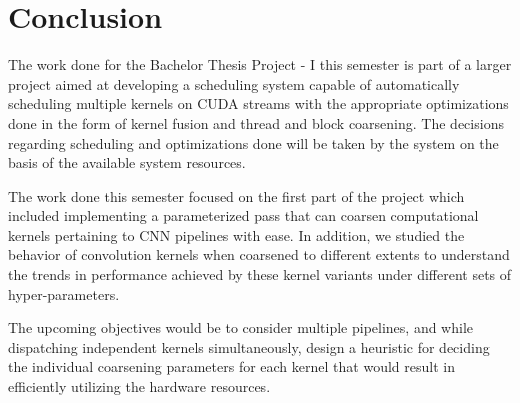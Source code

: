 
\chapter{Conclusion} %

\label{Chapter 4} %



The work done for the Bachelor Thesis Project - I this semester is part of a larger project aimed at developing a scheduling system capable of automatically scheduling multiple kernels on CUDA streams with the appropriate optimizations done in the form of kernel fusion and thread and block coarsening. The decisions regarding scheduling and optimizations done will be taken by the system on the basis of the available system resources.

The work done this semester focused on the first part of the project which included implementing a parameterized pass that can coarsen computational kernels pertaining to CNN pipelines with ease. In addition, we studied the behavior of convolution kernels when coarsened to different extents to understand the trends in performance achieved by these kernel variants under different sets of hyper-parameters.

The upcoming objectives would be to consider multiple pipelines, and while dispatching independent kernels simultaneously, design a heuristic for deciding the individual coarsening parameters for each kernel that would result in efficiently utilizing the hardware resources.
